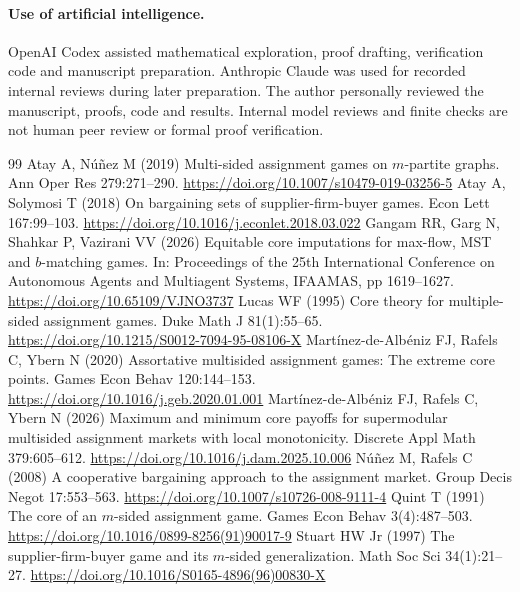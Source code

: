 \documentclass[11pt]{article}
\theoremstyle{remark}\newtheorem{remark}[theorem]{Remark}
\begin{document}
\paragraph{Use of artificial intelligence.}
OpenAI Codex assisted mathematical exploration, proof drafting, verification
code and manuscript preparation. Anthropic Claude was used for recorded
internal reviews during later preparation. The author personally reviewed
the manuscript, proofs, code and results. Internal model reviews and finite
checks are not human peer review or formal proof verification.

\begin{thebibliography}{99}
\small\setlength{\itemsep}{1pt}
Atay A, N\'u\~nez M (2019) Multi-sided assignment games on $m$-partite graphs.
Ann Oper Res 279:271--290. \url{https://doi.org/10.1007/s10479-019-03256-5}
Atay A, Solymosi T (2018) On bargaining sets of supplier-firm-buyer games.
Econ Lett 167:99--103. \url{https://doi.org/10.1016/j.econlet.2018.03.022}
Gangam RR, Garg N, Shahkar P, Vazirani VV (2026) Equitable core imputations
for max-flow, MST and $b$-matching games. In: Proceedings of the 25th
International Conference on Autonomous Agents and Multiagent Systems,
IFAAMAS, pp 1619--1627. \url{https://doi.org/10.65109/VJNO3737}
Lucas WF (1995) Core theory for multiple-sided assignment games.
Duke Math J 81(1):55--65. \url{https://doi.org/10.1215/S0012-7094-95-08106-X}
Mart\'inez-de-Alb\'eniz FJ, Rafels C, Ybern N (2020) Assortative multisided
assignment games: The extreme core points. Games Econ Behav 120:144--153.
\url{https://doi.org/10.1016/j.geb.2020.01.001}
Mart\'inez-de-Alb\'eniz FJ, Rafels C, Ybern N (2026) Maximum and minimum core
payoffs for supermodular multisided assignment markets with local monotonicity.
Discrete Appl Math 379:605--612. \url{https://doi.org/10.1016/j.dam.2025.10.006}
N\'u\~nez M, Rafels C (2008) A cooperative bargaining approach to the assignment
market. Group Decis Negot 17:553--563.
\url{https://doi.org/10.1007/s10726-008-9111-4}
Quint T (1991) The core of an $m$-sided assignment game.
Games Econ Behav 3(4):487--503. \url{https://doi.org/10.1016/0899-8256(91)90017-9}
Stuart HW Jr (1997) The supplier-firm-buyer game and its $m$-sided generalization.
Math Soc Sci 34(1):21--27. \url{https://doi.org/10.1016/S0165-4896(96)00830-X}
\end{thebibliography}
\end{document}
